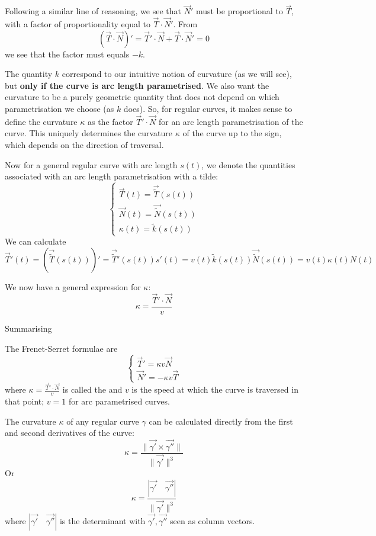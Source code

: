 Following a similar line of reasoning, we see that $\vec{N}'$ must be proportional to $\vec{T}$, with a factor of proportionality equal to $\vec{T}\cdot \vec{N}'$. From
\[ (\vec{T}\cdot \vec{N})' = \vec{T}'\cdot \vec{N} + \vec{T}\cdot \vec{N}' = 0 \]
we see that the factor must equals $-k$.

The quantity $k$ correspond to our intuitive notion of curvature (as we will see), but \textbf{only if the curve is arc length parametrised}. We also want the curvature to be a purely geometric quantity that does not depend on which parametrisation we choose (as $k$ does). So, for regular curves, it makes sense to define the curvature $\kappa$ as the factor $\vec{T}'\cdot \vec{N}$ for an arc length parametrisation of the curve. This uniquely determines the curvature $\kappa$ of the curve up to the sign, which depends on the direction of traversal.

Now for a general regular curve with arc length $s(t)$, we denote the quantities associated with an arc length parametrisation with a tilde:
\[ \begin{cases}
\vec{T}(t) = \vec{\tilde{T}}(s(t)) \\
\vec{N}(t) = \vec{\tilde{N}}(s(t)) \\
\kappa(t) = \tilde{k}(s(t))
\end{cases} \]
We can calculate
\[ \vec{T}'(t) = (\vec{\tilde{T}}(s(t)))' = \vec{\tilde{T}}'(s(t))s'(t) = v(t)\tilde{k}(s(t))\vec{\tilde{N}}(s(t)) = v(t)\kappa(t)N(t) \]

We now have a general expression for $\kappa$:
\[ \kappa = \frac{\vec{T}'\cdot \vec{N}}{v} \]

Summarising
\begin{eigenschap}
The Frenet-Serret formulae are
\[ \begin{cases}
\vec{T}' = \kappa v \vec{N} \\
\vec{N}' = -\kappa v \vec{T}
\end{cases} \]
where $\kappa = \frac{\vec{T}'\cdot \vec{N}}{v}$ is called the  and $v$ is the speed at which the curve is traversed in that point; $v=1$ for arc parametrised curves.
\end{eigenschap}

The curvature $\kappa$ of any regular curve $\gamma$ can be calculated directly from the first and second derivatives of the curve:
\[ \kappa = \frac{\lVert \vec{\gamma'} \times \vec{\gamma''}\lVert}{\lVert\vec{\gamma'}\lVert^3} \]
Or
\[ \kappa = \frac{| \vec{\gamma'} \quad \vec{\gamma''}|}{\lVert\vec{\gamma'}\lVert^3} \]
where $| \vec{\gamma'} \quad \vec{\gamma''}|$ is the determinant with $\vec{\gamma'},\vec{\gamma''}$ seen as column vectors.


